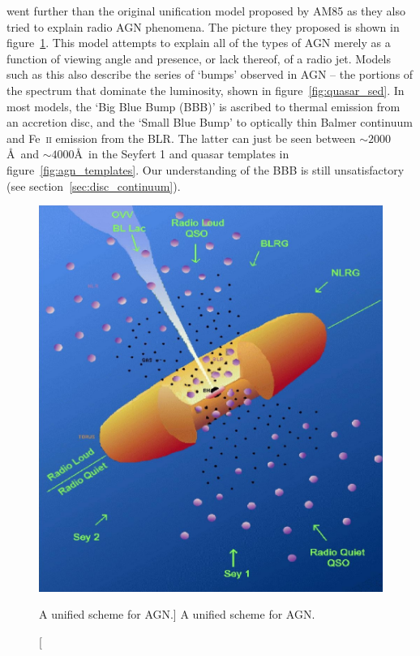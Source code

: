 \cite[][UP95]{UP95} went further than the original unification model
proposed by AM85 as they also tried to explain radio AGN phenomena.
The picture they proposed is shown in figure~\ref{fig:unification}.
This model attempts to explain all of the types of AGN 
merely as a function of viewing angle
and presence, or lack thereof, of a radio jet. Models such as this also 
describe the series of `bumps' observed in AGN -- the portions
of the spectrum that dominate the luminosity, shown in figure~\ref{fig:quasar_sed}. 
In most models, the `Big Blue Bump (BBB)' is ascribed to thermal 
emission from an accretion disc, and the `Small Blue Bump' to optically 
thin Balmer continuum and Fe~\textsc{ii} emission from the BLR.
The latter can just be seen between $\sim2000$\AA\ and 
$\sim4000$\AA\ in the Seyfert 1 and 
quasar templates in figure~\ref{fig:agn_templates}.
Our understanding of the BBB is still unsatisfactory 
(see section~\ref{sec:disc_continuum}).

\begin{figure}
\centering
\includegraphics[width=1.0\textwidth]{figures/01-intro/up95.png}
\caption
[A unified scheme for AGN.]
{
A unified scheme for AGN.
} 
\label{fig:unification}
\end{figure} 

